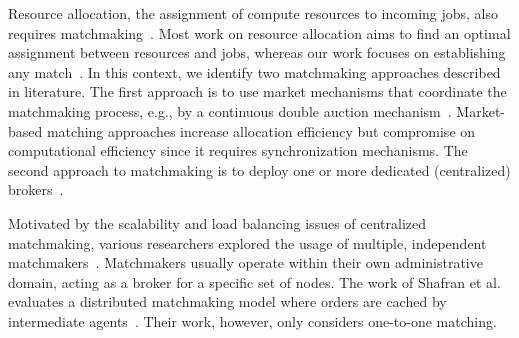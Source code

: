 
Resource allocation, the assignment of compute resources to incoming jobs, also requires matchmaking~\cite{czajkowski1998resource}.
Most work on resource allocation aims to find an optimal assignment between resources and jobs, whereas our work focuses on establishing any match~\cite{ludwig2012matchmaking}.
In this context, we identify two matchmaking approaches described in literature.
The first approach is to use market mechanisms that coordinate the matchmaking process, e.g., by a continuous double auction mechanism~\cite{gomoluch2003market,mihailescu2010distributed,Buyya2002EconomicMF}.
Market-based matching approaches increase allocation efficiency but compromise on computational efficiency since it requires synchronization mechanisms.
The second approach to matchmaking is to deploy one or more dedicated (centralized) brokers~\cite{raman1998matchmaking,frey2002condor,ebrahimi2004matchmaking}.

Motivated by the scalability and load balancing issues of centralized matchmaking, various researchers explored the usage of multiple, independent matchmakers~\cite{azab2008adaptive,edinger2016decentralized,abdullah2010effect,sigdel2005framework}.
Matchmakers usually operate within their own administrative domain, acting as a broker for a specific set of nodes.
The work of Shafran et al. evaluates a distributed matchmaking model where orders are cached by intermediate agents~\cite{shafran2008towards}.
Their work, however, only considers one-to-one matching.

